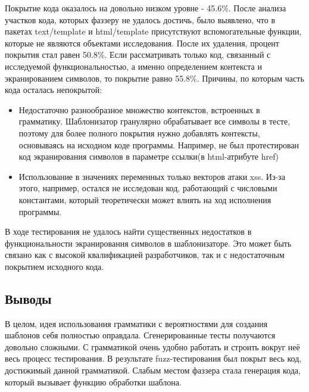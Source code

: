 \documentclass[a4paper]{article}
\begin{document}
Покрытие кода оказалось на довольно низком уровне - 45.6\%. После анализа участков кода, которых фаззеру не удалось достичь, было выявлено, что в пакетах text/template и html/template присутствуют вспомогательные функции, которые не являются объектами исследования. После их удаления, процент покрытия стал равен 50.8\%. Если рассматривать только код, связанный с исследуемой функциональностью, а именно определением контекста и экранированием символов, то покрытие равно 55.8\%.
Причины, по которым часть кода осталась непокрытой:
\begin{itemize}
    \item Недостаточно разнообразное множество контекстов, встроенных в грамматику. Шаблонизатор гранулярно обрабатывает все символы в тесте, поэтому для более полного покрытия нужно добавлять контексты, основываясь на исходном коде программы. Например, не был протестирован код экранирования символов в параметре ссылки(в html-атрибуте href)
    \item Использование в значениях переменных только векторов атаки xss. Из-за этого, например, остался не исследован код, работающий с числовыми константами, который теоретически может влиять на ход исполнения программы.
\end{itemize}

В ходе тестирования не удалось найти существенных недостатков в функциональности экранирования символов в шаблонизаторе. Это может быть связано как с высокой квалификацией разработчиков, так и с недостаточным покрытием исходного кода.

 
\subsection{Выводы}

В целом, идея использования грамматики с вероятностями для создания шаблонов себя полностью оправдала. Сгенерированные тесты получаются довольно сложными. С грамматикой очень удобно работать и строить вокруг неё весь процесс тестирования. В результате fuzz-тестирования был покрыт весь код, достижимый данной грамматикой. Слабым местом фаззера стала генерация кода, который вызывает функцию обработки шаблона. 
\end{document}
